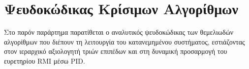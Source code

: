 
\chapter{Ψευδοκώδικας Κρίσιμων Αλγορίθμων}
\label{ch:appendix}

Στο παρόν παράρτημα παρατίθεται ο αναλυτικός ψευδοκώδικας των θεμελιωδών αλγορίθμων που διέπουν τη λειτουργία του κατανεμημένου συστήματος, εστιάζοντας στον ιεραρχικό αξιολογητή τριών επιπέδων και στη δυναμική προσαρμογή του ευρετηρίου RMI μέσω PID.
